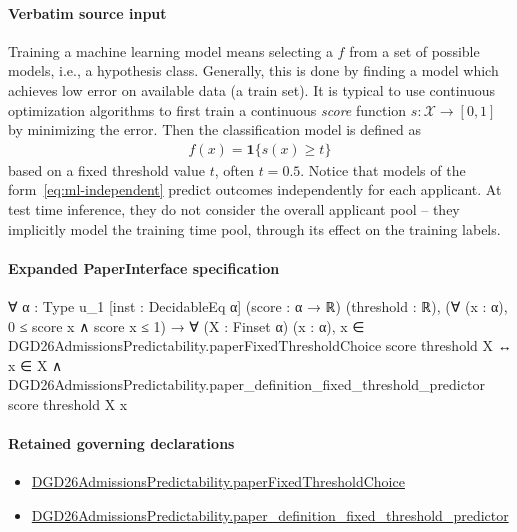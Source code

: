 \documentclass[10pt]{article}
\begin{document}
\paragraph{Verbatim source input}
\begin{ReviewVerbatim}
Training a machine learning model means selecting a $f$ from a set of possible models, i.e., a hypothesis class.
Generally, this is done by finding a model which achieves low error on available data (a train set).
It is typical to use continuous optimization algorithms to first train a continuous \emph{score} function $s:\mathcal X\to [0,1]$ by minimizing the error.
Then the classification model is defined as
\begin{align}\label{eq:ml-independent}
    f(x) = \mathbf 1\{s(x)\geq t\}
\end{align} based on a fixed threshold value $t$, often $t=0.5$.
Notice that models of the form~\eqref{eq:ml-independent} predict outcomes independently for each applicant.
At test time inference, they do not consider the overall applicant pool -- they implicitly model the training time pool, through its effect on the training labels.
\end{ReviewVerbatim}



\paragraph{Expanded PaperInterface specification}
\begin{ReviewVerbatim}
∀ {α : Type u_1} [inst : DecidableEq α] (score : α → ℝ) (threshold : ℝ),
  (∀ (x : α), 0 ≤ score x ∧ score x ≤ 1) →
    ∀ (X : Finset α) (x : α),
      x ∈ DGD26AdmissionsPredictability.paperFixedThresholdChoice score threshold X ↔
        x ∈ X ∧ DGD26AdmissionsPredictability.paper_definition_fixed_threshold_predictor score threshold X x
\end{ReviewVerbatim}

\paragraph{Retained governing declarations}
\begin{itemize}\raggedright
\item \hyperlink{governing-declaration-27493c7b41f4e060}{DGD26\allowbreak{}Admissions\allowbreak{}Predictability.\allowbreak{}paper\allowbreak{}Fixed\allowbreak{}Threshold\allowbreak{}Choice}
\item \hyperlink{governing-declaration-f88639e6ec4557a8}{DGD26\allowbreak{}Admissions\allowbreak{}Predictability.\allowbreak{}paper\_\allowbreak{}definition\_\allowbreak{}fixed\_\allowbreak{}threshold\_\allowbreak{}predictor}
\end{itemize}
\end{document}
